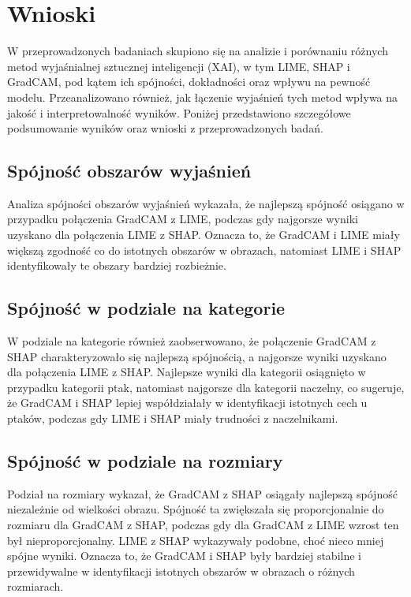 
\chapter*{Wnioski}

W przeprowadzonych badaniach skupiono się na analizie i porównaniu różnych metod wyjaśnialnej sztucznej inteligencji (XAI), w tym LIME, SHAP i GradCAM, pod kątem ich spójności, dokładności oraz wpływu na pewność modelu.
Przeanalizowano również, jak łączenie wyjaśnień tych metod wpływa na jakość i interpretowalność wyników.
Poniżej przedstawiono szczegółowe podsumowanie wyników oraz wnioski z przeprowadzonych badań.

\section*{Spójność obszarów wyjaśnień}

Analiza spójności obszarów wyjaśnień wykazała, że najlepszą spójność osiągano w przypadku połączenia GradCAM z LIME, podczas gdy najgorsze wyniki uzyskano dla połączenia LIME z SHAP.
Oznacza to, że GradCAM i LIME miały większą zgodność co do istotnych obszarów w obrazach, natomiast LIME i SHAP identyfikowały te obszary bardziej rozbieżnie.

\section*{Spójność w podziale na kategorie}

W podziale na kategorie również zaobserwowano, że połączenie GradCAM z SHAP charakteryzowało się najlepszą spójnością, a najgorsze wyniki uzyskano dla połączenia LIME z SHAP.
Najlepsze wyniki dla kategorii osiągnięto w przypadku kategorii ptak, natomiast najgorsze dla kategorii naczelny, co sugeruje, że GradCAM i SHAP lepiej współdziałały w identyfikacji istotnych cech u ptaków, podczas gdy LIME i SHAP miały trudności z naczelnikami.

\section*{Spójność w podziale na rozmiary}

Podział na rozmiary wykazał, że GradCAM z SHAP osiągały najlepszą spójność niezależnie od wielkości obrazu. Spójność ta zwiększała się proporcjonalnie do rozmiaru dla GradCAM z SHAP, podczas gdy dla GradCAM z LIME wzrost ten był nieproporcjonalny.
LIME z SHAP wykazywały podobne, choć nieco mniej spójne wyniki.
Oznacza to, że GradCAM i SHAP były bardziej stabilne i przewidywalne w identyfikacji istotnych obszarów w obrazach o różnych rozmiarach.

